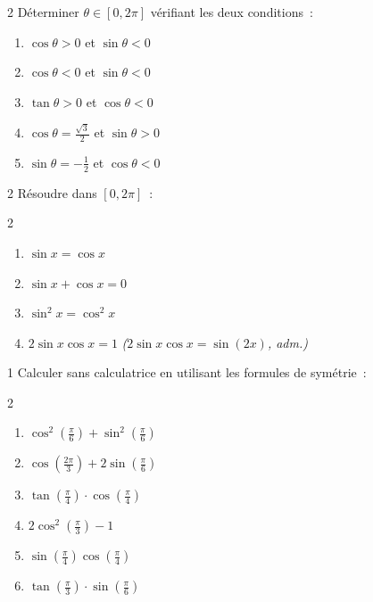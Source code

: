 \begin{exo}{2}
D\'eterminer $\theta\in[0,2\pi]$ v\'erifiant les deux conditions~:
\begin{enumerate}
  \item $\cos\theta > 0$ et $\sin\theta < 0$
  \item $\cos\theta < 0$ et $\sin\theta < 0$
  \item $\tan\theta > 0$ et $\cos\theta < 0$
  \item $\cos\theta = \frac{\sqrt{3}}{2}$ et $\sin\theta > 0$
  \item $\sin\theta = -\frac{1}{2}$ et $\cos\theta < 0$
\end{enumerate}
\end{exo}

\begin{exo}{2}
R\'esoudre dans {$[0,2\pi]$}~:
\begin{multicols}{2}
\begin{enumerate}
  \item $\sin x = \cos x$
  \item $\sin x + \cos x = 0$
  \item $\sin^2 x = \cos^2 x$
  \item $2\sin x \cos x = 1$
        \emph{($2\sin x\cos x = \sin(2x)$, adm.)}
\end{enumerate}
\end{multicols}
\end{exo}

\begin{exo}{1}
Calculer sans calculatrice en utilisant les formules de sym\'etrie~:
\begin{multicols}{2}
\begin{enumerate}
  \item $\cos^2(\frac{\pi}{6})+\sin^2(\frac{\pi}{6})$
  \item $\cos(\frac{2\pi}{3})+2\sin(\frac{\pi}{6})$
  \item $\tan(\frac{\pi}{4})\cdot\cos(\frac{\pi}{4})$
  \item $2\cos^2(\frac{\pi}{3})-1$
  \item $\sin(\frac{\pi}{4})\cos(\frac{\pi}{4})$
  \item $\tan(\frac{\pi}{3})\cdot\sin(\frac{\pi}{6})$
\end{enumerate}
\end{multicols}
\end{exo}


